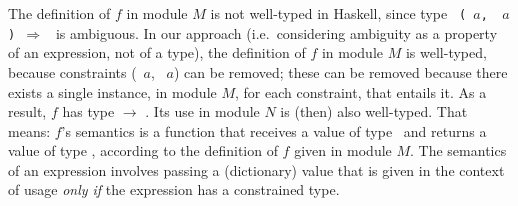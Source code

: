 

The definition of $f$ in module $M$ is not well-typed in Haskell, since type {\tt
 (\SShow\ $a$, \RRead\ $a$) $\Rightarrow$ \String} is ambiguous. 
In our approach (i.e.~considering ambiguity as a property of an
expression, not of a type), the definition of $f$ in module $M$ is
well-typed, because constraints
(\SShow\ $a$, \RRead\ $a$) can be removed; these
can be removed because there exists a single instance, in
module $M$, for each constraint, that entails it. As a result, $f$ has
type \String $\rightarrow$ \String. Its use in module $N$ is (then)
also well-typed. That means: $f$'s semantics is a function that
receives a value of type \String\ and returns a value of type \String,
according to the definition of $f$ given in module $M$. The semantics
of an expression involves passing a (dictionary) value that is given
in the context of usage {\em only if} the expression has a
constrained type.



